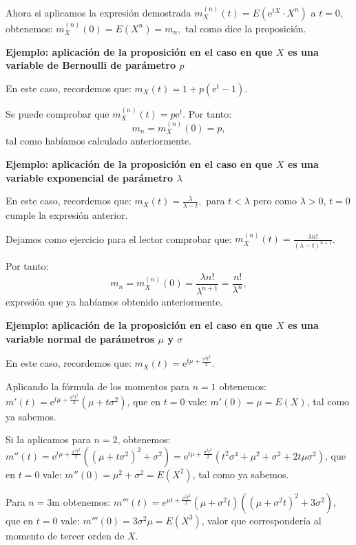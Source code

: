 \documentclass[]{book}
\begin{document}
Ahora si aplicamos la expresión demostrada \(m_X^{(n)}(t) =E\left(\mathrm{e}^{tX}\cdot X^n\right)\) a \(t=0\), obtenemos:
\(m_X^{(n)}(0) =E\left(X^n\right)=m_n,\)
tal como dice la proposición.

\textbf{Ejemplo: aplicación de la proposición en el caso en que \(X\) es una variable de Bernoulli de parámetro \(p\)}

En este caso, recordemos que: \(m_X (t)=1+p\left(\mathrm{e}^t -1 \right).\)

Se puede comprobar que \(m_X^{(n)}(t)=p\mathrm{e}^t\). Por tanto:
\[
m_n = m_X^{(n)}(0)=p,
\]
tal como habíamos calculado anteriormente.

\textbf{Ejemplo: aplicación de la proposición en el caso en que \(X\) es una variable exponencial de parámetro \(\lambda\)}

En este caso, recordemos que: \(m_X (t)=\frac{\lambda}{\lambda -t},\) para \(t<\lambda\) pero como \(\lambda >0\), \(t=0\) cumple la expresión anterior.

Dejamos como ejercicio para el lector comprobar que: \(m_X^{(n)}(t)=\frac{\lambda n!}{(\lambda-t)^{n+1}}\).

Por tanto:
\[
m_n = m_X^{(n)}(0) = \frac{\lambda n!}{\lambda^{n+1}}=\frac{n!}{\lambda^n},
\]
expresión que ya habíamos obtenido anteriormente.

\textbf{Ejemplo: aplicación de la proposición en el caso en que \(X\) es una variable normal de parámetros \(\mu\) y \(\sigma\)}

En este caso, recordemos que: \(m_X (t)=\mathrm{e}^{ t \mu +\frac{\sigma^2 t^2}{2}}.\)

Aplicando la fórmula de los momentos para \(n=1\) obtenemos:
\(m'(t)=\mathrm{e}^{ t \mu +\frac{\sigma^2 t^2}{2}} \left(\mu+t\sigma^2\right)\), que en \(t=0\) vale:
\(m'(0)=\mu=E(X)\), tal como ya sabemos.

Si la aplicamos para \(n=2\), obtenemos:
\(m''(t)=\mathrm{e}^{ t \mu +\frac{\sigma^2 t^2}{2}} \left((\mu+t\sigma^2)^2+ \sigma^2 \right) =\mathrm{e}^{ t \mu +\frac{\sigma^2 t^2}{2}} \left(t^2\sigma^4+\mu^2+\sigma^2+ 2t\mu\sigma^2 \right)\), que en \(t=0\) vale:
\(m''(0)=\mu^2+\sigma^2=E\left(X^2\right)\), tal como ya sabemos.

Para \(n=3\)m obtenemos:
\(m'''(t)=e^{\mu t+\frac{\sigma ^2 t^2}{2}}\left(\mu +\sigma ^2 t\right) \left(\left(\mu +\sigma ^2 t\right)^2+3 \sigma ^2\right)\), que en \(t=0\) vale: \(m'''(0)=3\sigma^2\mu = E\left(X^3\right)\), valor que correspondería al momento de tercer orden de \(X\).
\end{document}
